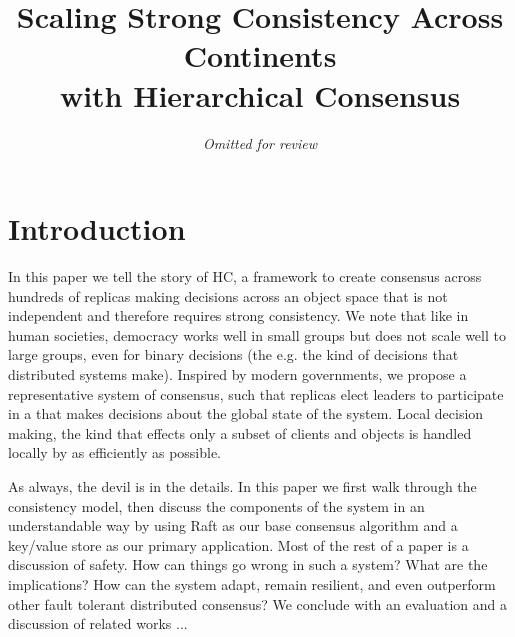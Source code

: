 \documentclass[10pt,twocolumn]{article}
\begin{document}
\title{\bf Scaling Strong Consistency Across Continents\\
with Hierarchical Consensus}
\author{\emph{Omitted for review}}
\date{}

\maketitle

\thispagestyle{empty}

\begin{abstract}
    
\end{abstract}

\section*{Introduction}

In this paper we tell the story of HC, a framework to create consensus across
hundreds of replicas making decisions across an object space that is not
independent and therefore requires strong consistency.
We note that like in human societies, democracy works well in small groups
but does not scale well to large groups, even for binary decisions (the e.g.
the kind of decisions that distributed systems make).
Inspired by modern governments, we propose a representative system of
consensus, such that replicas elect leaders to participate in a \roo that
makes decisions about the global state of the system.
Local decision making, the kind that effects only a subset of clients and
objects is handled locally by \subs as efficiently as possible.

As always, the devil is in the details.
In this paper we first walk through the consistency model, then discuss the
components of the system in an understandable way by using Raft as our base
consensus algorithm and a key/value store as our primary application.
Most of the rest of a paper is a discussion of safety.
How can things go wrong in such a system? What are the implications? How can
the system adapt, remain resilient, and even outperform other fault tolerant
distributed consensus?
We conclude with an evaluation and a discussion of related works ...
\end{document}
